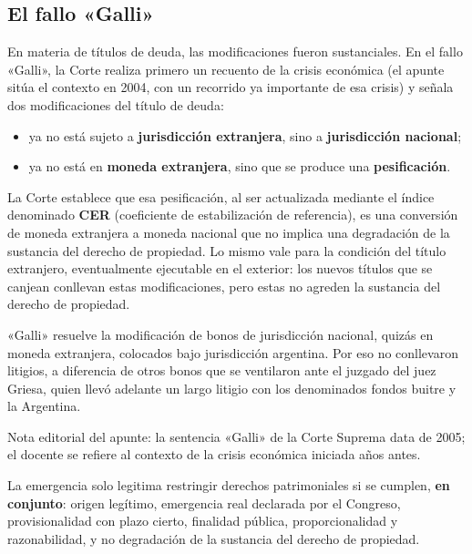 \documentclass[12pt,oneside]{book}
\begin{document}
\subsection{El fallo «Galli»}

En materia de títulos de deuda, las modificaciones fueron sustanciales. En el fallo «Galli», la Corte realiza primero un recuento de la crisis económica (el apunte sitúa el contexto en 2004, con un recorrido ya importante de esa crisis) y señala dos modificaciones del título de deuda:

\begin{itemize}
    \item ya no está sujeto a \textbf{jurisdicción extranjera}, sino a \textbf{jurisdicción nacional};
    \item ya no está en \textbf{moneda extranjera}, sino que se produce una \textbf{pesificación}.
\end{itemize}

La Corte establece que esa pesificación, al ser actualizada mediante el índice denominado \textbf{CER} (coeficiente de estabilización de referencia), es una conversión de moneda extranjera a moneda nacional que no implica una degradación de la sustancia del derecho de propiedad. Lo mismo vale para la condición del título extranjero, eventualmente ejecutable en el exterior: los nuevos títulos que se canjean conllevan estas modificaciones, pero estas no agreden la sustancia del derecho de propiedad.

«Galli» resuelve la modificación de bonos de jurisdicción nacional, quizás en moneda extranjera, colocados bajo jurisdicción argentina. Por eso no conllevaron litigios, a diferencia de otros bonos que se ventilaron ante el juzgado del juez Griesa, quien llevó adelante un largo litigio con los denominados fondos buitre y la Argentina.

\begin{note}
Nota editorial del apunte: la sentencia «Galli» de la Corte Suprema data de 2005; el docente se refiere al contexto de la crisis económica iniciada años antes.
\end{note}

\begin{important}
La emergencia solo legitima restringir derechos patrimoniales si se cumplen, \textbf{en conjunto}: origen legítimo, emergencia real declarada por el Congreso, provisionalidad con plazo cierto, finalidad pública, proporcionalidad y razonabilidad, y no degradación de la sustancia del derecho de propiedad.
\end{important}
\end{document}
